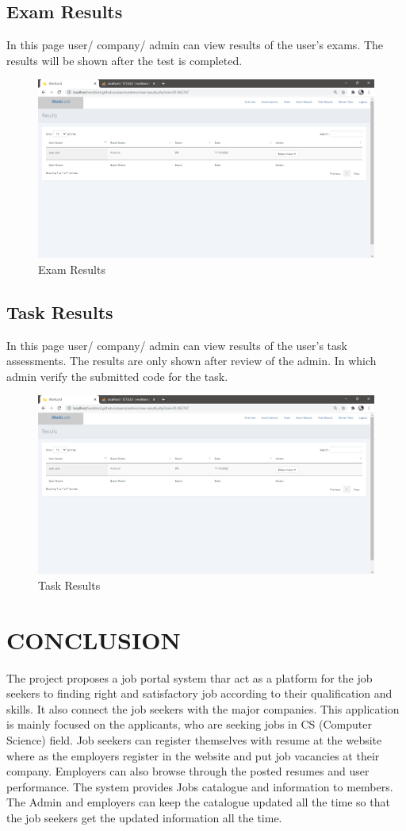 \documentclass[a4paper,12pt]{report}
\begin{document}
\section {Exam Results}
In this page user/ company/ admin can view results of the user's exams. The results will be shown after the test is completed. 
\begin{figure}[bph]
	\centering
	\includegraphics[width=.7\linewidth ]{img/screenshots/exams_results_pre}
	\caption{Exam Results}
\end{figure}

\section {Task Results}
In this page user/ company/ admin can view results of the user's task assessments. The results are only shown after review of the admin. In which admin verify the submitted code for the task.
\begin{figure}[bph]
	\centering
	\includegraphics[width=.7\linewidth ]{img/screenshots/exams_results_pre}
	\caption{Task Results}
\end{figure}


\pagebreak

\chapter{CONCLUSION}

The project  proposes a job portal system thar act as a platform for the job seekers to  finding right and satisfactory job according to their qualification and skills. It also connect the job seekers with the major companies. This application is mainly focused on the applicants, who are seeking jobs in CS (Computer Science) field. Job seekers can register themselves with resume at the website where as the employers register in the website and put job vacancies at their company. Employers can also browse through the posted resumes and user performance. The system provides Jobs catalogue and information to members. The Admin and employers can keep the catalogue updated all the time so that the job seekers get the updated information all the time.\\
\end{document}
